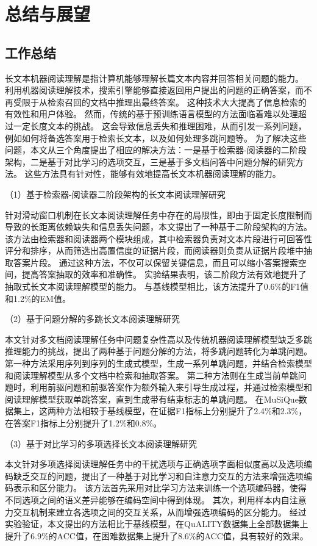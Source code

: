 \chapter{总结与展望}

\section{工作总结}
长文本机器阅读理解是指计算机能够理解长篇文本内容并回答相关问题的能力。
利用机器阅读理解技术，搜索引擎能够直接返回用户提出的问题的正确答案，而不再受限于从检索召回的文档中推理出最终答案。
这种技术大大提高了信息检索的有效性和用户体验。
然而，传统的基于预训练语言模型的方法面临着难以处理超过一定长度文本的挑战。
这会导致信息丢失和推理困难，从而引发一系列问题，例如如何将备选答案用于检索长文本，以及如何处理多跳问题等。
为了解决这些问题，本文从三个角度提出了相应的解决方法：一是基于检索器-阅读器的二阶段架构，二是基于对比学习的选项交互，三是基于多文档问答中问题分解的研究方法。
这些方法具有针对性，能够有效地提高长文本机器阅读理解的能力。

（1）基于检索器-阅读器二阶段架构的长文本阅读理解研究

针对滑动窗口机制在长文本阅读理解任务中存在的局限性，即由于固定长度限制而导致的长距离依赖缺失和信息丢失问题，本文提出了一种基于二阶段架构的方法。
该方法由检索器和阅读器两个模块组成，其中检索器负责对文本片段进行可回答性评分和排序，从而筛选出高置信度的证据片段，而阅读器则负责从证据片段堆中抽取答案片段。
通过这种方法，不仅可以保留关键信息，而且可以缩小答案搜索空间，提高答案抽取的效率和准确性。
实验结果表明，该二阶段方法有效地提升了抽取式长文本阅读理解模型的能力。
与基线模型相比，该方法提升了0.6\%的F1值和1.2\%的EM值。

（2）基于问题分解的多跳长文本阅读理解研究

本文针对多文档阅读理解任务中问题复杂性高以及传统机器阅读理解模型缺乏多跳推理能力的挑战，提出了两种基于问题分解的方法，将多跳问题转化为单跳问题。
第一种方法采用序列到序列的生成式模型，生成一系列单跳问题，并结合检索模型和阅读理解模型从多个文档中检索和抽取答案。
第二种方法则在生成当前单跳问题时，利用前驱问题和前驱答案作为额外输入来引导生成过程，并通过检索模型和阅读理解模型获取单跳答案，直到生成带有结束标志的单跳问题。
在MuSiQue数据集上，这两种方法相较于基线模型，在证据F1指标上分别提升了2.4\%和2.3\%，在答案F1指标上分别提升了1.2\%和0.8\%。

（3）基于对比学习的多项选择长文本阅读理解研究

本文针对多项选择阅读理解任务中的干扰选项与正确选项字面相似度高以及选项编码缺乏交互的问题，提出了一种基于对比学习和自注意力交互的方法来增强选项编码表示和区分能力。
该方法首先采用对比学习方法来训练一个选项编码器，使得不同选项之间的语义差异能够在编码空间中得到体现。
其次，利用样本内自注意力交互机制来建立各选项之间的交互关系，从而增强选项编码的区分能力。
经过实验验证，本文提出的方法相比于基线模型，在QuALITY数据集上全部数据集上提升了6.9\%的ACC值，在困难数据集上提升了8.6\%的ACC值，具有较好的效果。


